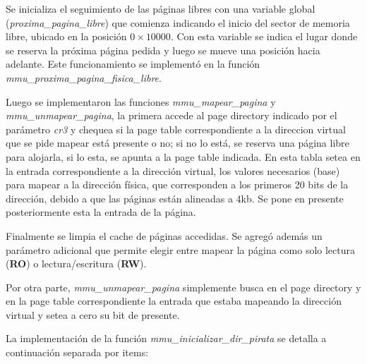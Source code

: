 Se inicializa el seguimiento de las páginas libres con una variable global
({\it proxima_pagina_libre\/}) que comienza indicando el inicio del sector de
memoria libre, ubicado en la posición $0\times10000$. Con esta variable se
indica el lugar donde se reserva la próxima página pedida y luego se mueve una
posición hacia adelante. Este funcionamiento se implementó en la función
{\it mmu_proxima_pagina_fisica_libre\/}.

Luego se implementaron las funciones {\it mmu_mapear_pagina\/} y
{\it mmu_unmapear_pagina\/}, la primera accede al page directory indicado por
el parámetro {\it cr3\/} y chequea si la page table correspondiente a la
direccion virtual que se pide mapear está presente o no; si no lo está, se
reserva una página libre para alojarla, si lo esta, se apunta a la page table
indicada. En esta tabla setea en la entrada correspondiente a la dirección
virtual, los valores necesarios (base) para mapear a la dirección física, que
corresponden a los primeros 20 bits de la dirección, debido a que las páginas
están alineadas a 4kb. Se pone en presente posteriormente esta la entrada de la
página.

Finalmente se limpia el cache de páginas accedidas. Se agregó además un
parámetro adicional que permite elegir entre mapear la página como
solo lectura ({\bf RO}) o lectura/escritura ({\bf RW}).

Por otra parte, {\it mmu_unmapear_pagina\/} simplemente busca en el page
directory y en la page table correspondiente la entrada que estaba mapeando la
dirección virtual y setea a cero su bit de presente.

La implementación de la función {\it mmu_inicializar_dir_pirata\/} se detalla a
continuación separada por items:

